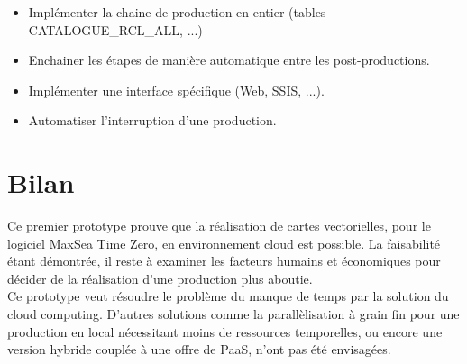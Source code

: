 \begin{itemize}
\item[] Implémenter la chaine de production en entier (tables
  CATALOGUE\_RCL\_ALL, ...)
\item[] Enchainer les étapes de manière automatique entre les
  post-productions.
\item[] Implémenter une interface spécifique (Web, SSIS, ...).
\item[] Automatiser l'interruption d'une production.
\end{itemize}



\section{Bilan}
Ce premier prototype prouve que la réalisation de cartes vectorielles,
pour le logiciel MaxSea Time Zero, en environnement cloud est
possible.  La faisabilité étant démontrée, il reste à examiner les
facteurs humains et économiques pour décider de la réalisation d'une
production plus aboutie.\\

Ce prototype veut résoudre le problème du manque de temps par la
solution du cloud computing. D'autres solutions comme la
parallèlisation à grain fin pour une production en local nécessitant
moins de ressources temporelles, ou encore une version hybride couplée
à une offre de PaaS, n'ont pas été envisagées.



